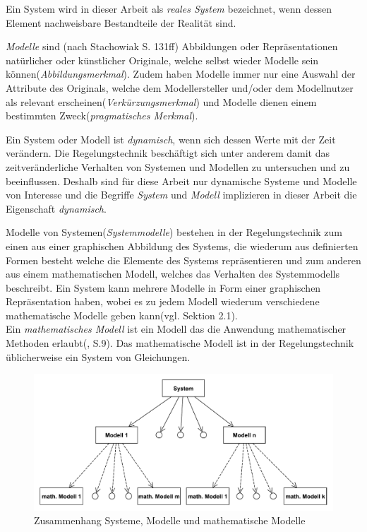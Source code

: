 Ein System wird in dieser Arbeit als \textit{reales System} bezeichnet, wenn dessen Element nachweisbare Bestandteile der Realität sind.

\textit{Modelle} sind (nach Stachowiak\cite{STA73} S. 131ff) Abbildungen oder Repräsentationen natürlicher oder künstlicher Originale, welche selbst wieder Modelle sein können(\textit{Abbildungsmerkmal}). Zudem haben Modelle immer nur eine Auswahl der Attribute des Originals, welche dem Modellersteller und/oder dem Modellnutzer als relevant erscheinen(\textit{Verkürzungsmerkmal}) und Modelle dienen einem bestimmten Zweck(\textit{pragmatisches Merkmal}). 

Ein System oder Modell ist \textit{dynamisch}, wenn sich dessen Werte mit der Zeit verändern. Die Regelungstechnik beschäftigt sich unter anderem damit das zeitveränderliche Verhalten von Systemen und Modellen zu untersuchen und zu beeinflussen. Deshalb sind für diese Arbeit nur dynamische Systeme und Modelle von Interesse und die Begriffe \textit{System} und \textit{Modell} implizieren in dieser Arbeit die Eigenschaft \textit{dynamisch}. 

Modelle von Systemen(\textit{Systemmodelle}) bestehen in der Regelungstechnik zum einen aus einer graphischen Abbildung des Systems, die wiederum aus definierten Formen besteht welche die Elemente des Systems repräsentieren und zum anderen aus einem mathematischen Modell, welches das Verhalten des Systemmodells beschreibt. Ein System kann mehrere Modelle in Form einer graphischen Repräsentation haben, wobei es zu jedem Modell wiederum verschiedene mathematische Modelle geben kann(vgl. \cite{LUD95} Sektion 2.1).\\
Ein \textit{mathematisches Modell} ist ein Modell das die Anwendung mathematischer Methoden erlaubt(\cite{GRVO16}, S.9). Das mathematische Modell ist in der Regelungstechnik üblicherweise ein System von Gleichungen. 

\begin{figure}[H]
	\centering
	\includegraphics[width=0.9\linewidth]{Systeme_Modelle_Math_Beschreibung}
	\caption{Zusammenhang Systeme, Modelle und mathematische Modelle}
	\label{fig:SysModelleSkizze}
\end{figure}

